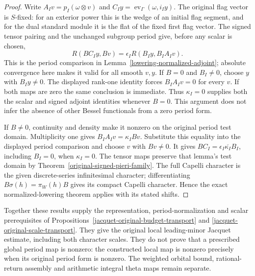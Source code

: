 \begin{proof}
Write $A_Iv=p_I(\omega\otimes v)$ and
$C_Iy=\operatorname{ev}_{\Gamma}(\omega,i_Iy)$.
The original flag vector is $S$-fixed: for an exterior power this
is the wedge of an initial flag segment, and for the dual standard
module it is the flat of the fixed first flag vector.
The signed tensor pairing and the unchanged subgroup period give,
before any scalar is chosen,
\[
 R(BC_Iy,Bv)=\epsilon_I R(B_Iy,B_IA_Iv).
\]
This is the period comparison in
Lemma~\ref{lowering-normalized-adjoint}; absolute convergence
here makes it valid for all smooth $v,y$.
If $B=0$ and $B_I\ne0$, choose $y$ with $B_Iy\ne0$.
The displayed rank-one identity forces $B_IA_Iv=0$ for every $v$.
If both maps are zero the same conclusion is immediate.
Thus $\kappa_I=0$ supplies both the scalar and signed adjoint
identities whenever $B=0$. This argument does not infer the
absence of other Bessel functionals from a zero period form.

If $B\ne0$, continuity and density make it nonzero on the original
period test domain. Multiplicity one gives
$B_IA_Iv=\kappa_I Bv$. Substitute this equality into the displayed
period comparison and choose $v$ with $Bv\ne0$. It gives
$BC_I=\epsilon_I\overline{\kappa_I}B_I$, including $B_I=0$,
when $\kappa_I=0$.
The tensor maps preserve that lemma's test domain by
Theorem~\ref{original-signed-pieri-family}.
The full Capelli character is the given discrete-series
infinitesimal character; differentiating $B\sigma(h)=\pi_W(h)B$
gives its compact Capelli character. Hence the exact
normalized-lowering theorem applies with its stated shifts.
\end{proof}

Together these results supply the representation, period-normalization
and scalar prerequisites of
Propositions~\ref{jacquet-original-budget-transport} and
\ref{jacquet-original-scale-transport}. They give the original local
leading-minor Jacquet estimate, including both character scales.
They do not prove that a prescribed global period map is nonzero:
the constructed local map is nonzero precisely when its original
period form is nonzero. The weighted orbital bound, rational-return
assembly and arithmetic integral theta maps remain separate.
